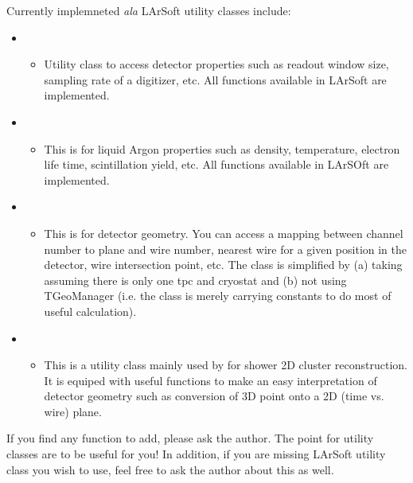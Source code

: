 Currently implemneted {\it ala} LArSoft utility classes include:
\begin{itemize}
  \item \DetectorProperties
    \begin{itemize}
      \item Utility class to access detector properties such as readout window size, sampling rate of a digitizer, etc. All functions available in LArSoft are implemented.
    \end{itemize}

  \item \LArProperties
    \begin{itemize}
      \item This is for liquid Argon properties such as density, temperature, electron life time, scintillation yield, etc. All functions available in LArSOft are implemented.
    \end{itemize}

  \item \Geometry
    \begin{itemize}
      \item This is for detector geometry. You can access a mapping between channel number to plane and wire number, nearest wire for a given position in the detector, wire intersection point, etc. The class is simplified by (a) taking assuming there is only one tpc and cryostat and (b) not using TGeoManager (i.e. the class is merely carrying constants to do most of useful calculation).
    \end{itemize}

  \item \GeometryUtilities
     \begin{itemize}
       \item This is a utility class mainly used by for shower 2D cluster reconstruction. It is equiped with useful functions to make an easy interpretation of detector geometry such as conversion of 3D point onto a 2D (time vs. wire) plane.
     \end{itemize}

\end{itemize}

If you find any function to add, please ask the author. The point for utility classes are to be useful for you! In addition, if you are missing LArSoft utility class you wish to use, feel free to ask the author about this as well.
